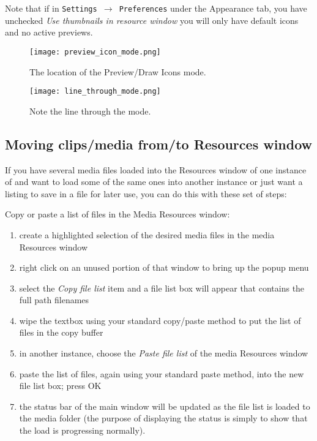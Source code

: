 Note that if in \texttt{Settings $\rightarrow$ Preferences} under the Appearance tab, you have unchecked \textit{Use thumbnails in resource window} you will only have default icons and no active previews.

\begin{figure}[htpb]
    \begin{minipage}{.69\linewidth}
        \centering
        \texttt{[image: preview\_icon\_mode.png]}
        \caption{The location of the Preview/Draw Icons mode.}
        \label{fig:preview_icon_mode}
    \end{minipage}
    \hfill
    \begin{minipage}{.29\linewidth}
        \vspace{2ex}
        \centering
        \texttt{[image: line\_through\_mode.png]}
        \caption{Note the line through the mode.}
        \label{fig:line_through_mode}
    \end{minipage}
\end{figure}



\subsection{Moving clips/media from/to Resources window}%
\label{sub:moving_clips_media_from_to_resources_window}

If you have several media files loaded into the Resources window of one instance of \CGG{} and want to load some of the same ones into another instance or just want a listing to save in a file for later use, you can do this with these set of steps:

Copy or paste a list of files in the Media Resources window:  


\begin{enumerate}
    \item  create a highlighted selection of the desired media files in the media Resources window
    \item    right click on an unused portion of that window to bring up the popup menu
    \item     select the \textit{Copy file list} item and a file list box will appear that contains the full path filenames
    \item     wipe the textbox using your standard copy/paste method to put the list of files in the copy buffer
    \item     in another \CGG{} instance, choose the \textit{Paste file list} of the media Resources window
    \item     paste the list of files, again using your standard paste method, into the new file list box; press OK
    \item    the status bar of the main window will be updated as the file list is loaded to the media folder (the purpose of displaying the status is simply to show that the load is progressing normally).
\end{enumerate}

